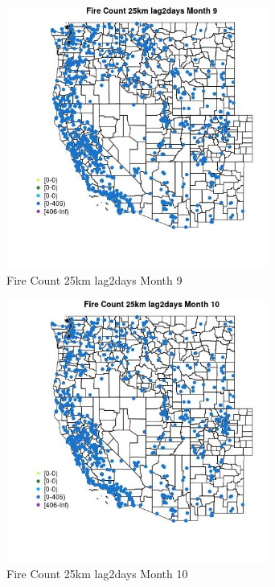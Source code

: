 \begin{figure} 
\centering  
\includegraphics[width=0.77\textwidth]{Code_Outputs/Report_ML_input_PM25_Step4_part_f_de_duplicated_aves_prioritize_24hr_obswNAs_MapObsMo9Fire_Count_25km_lag2days.jpg} 
\caption{\label{fig:Report_ML_input_PM25_Step4_part_f_de_duplicated_aves_prioritize_24hr_obswNAsMapObsMo9Fire_Count_25km_lag2days}Fire Count 25km lag2days Month 9} 
\end{figure} 
 

\begin{figure} 
\centering  
\includegraphics[width=0.77\textwidth]{Code_Outputs/Report_ML_input_PM25_Step4_part_f_de_duplicated_aves_prioritize_24hr_obswNAs_MapObsMo10Fire_Count_25km_lag2days.jpg} 
\caption{\label{fig:Report_ML_input_PM25_Step4_part_f_de_duplicated_aves_prioritize_24hr_obswNAsMapObsMo10Fire_Count_25km_lag2days}Fire Count 25km lag2days Month 10} 
\end{figure} 
 

